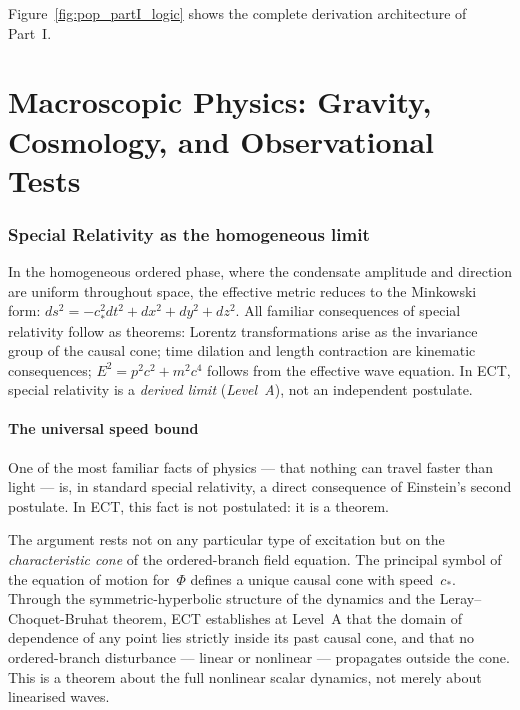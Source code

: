 \documentclass[11pt,a4paper]{article}
\begin{document}
Figure~\ref{fig:pop_partI_logic} shows the complete derivation architecture of Part~I.

\FloatBarrier

\newpage
\part{Macroscopic Physics: Gravity, Cosmology, and Observational Tests}
\label{part:macro_pop}

\section{Special Relativity as the homogeneous limit}

In the homogeneous ordered phase, where the condensate amplitude and direction are uniform throughout space, the effective metric reduces to the Minkowski form: $ds^2 = -c_*^2 dt^2 + dx^2 + dy^2 + dz^2$. All familiar consequences of special relativity follow as theorems: Lorentz transformations arise as the invariance group of the causal cone; time dilation and length contraction are kinematic consequences; $E^2 = p^2c^2 + m^2c^4$ follows from the effective wave equation. In ECT, special relativity is a \emph{derived limit} (\emph{Level~A}), not an independent postulate.

\subsection{The universal speed bound}

One of the most familiar facts of physics --- that nothing can travel faster than light --- is, in standard special relativity, a direct consequence of Einstein's second postulate. In ECT, this fact is not postulated: it is a theorem.

The argument rests not on any particular type of excitation but on the \emph{characteristic cone} of the ordered-branch field equation. The principal symbol of the equation of motion for~$\Phi$ defines a unique causal cone with speed~$c_*$. Through the symmetric-hyperbolic structure of the dynamics and the Leray--Choquet-Bruhat theorem, ECT establishes at Level~A that the domain of dependence of any point lies strictly inside its past causal cone, and that no ordered-branch disturbance --- linear or nonlinear --- propagates outside the cone. This is a theorem about the full nonlinear scalar dynamics, not merely about linearised waves.
\end{document}
